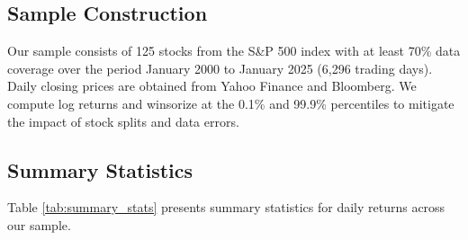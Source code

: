 \documentclass[12pt,a4paper]{article}
\begin{document}
\subsection{Sample Construction}

Our sample consists of 125 stocks from the S\&P 500 index with at least 70\% data coverage over the period January 2000 to January 2025 (6,296 trading days). Daily closing prices are obtained from Yahoo Finance and Bloomberg. We compute log returns and winsorize at the 0.1\% and 99.9\% percentiles to mitigate the impact of stock splits and data errors.

\subsection{Summary Statistics}

Table \ref{tab:summary_stats} presents summary statistics for daily returns across our sample.
\end{document}
